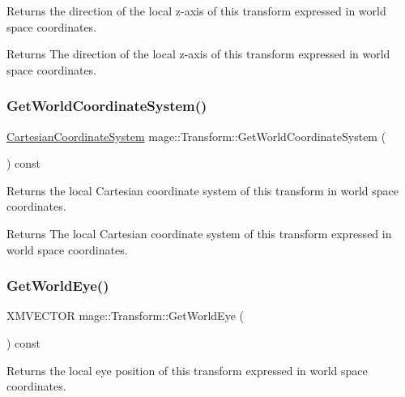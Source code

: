 Returns the direction of the local z-\/axis of this transform expressed in world space coordinates.

\begin{DoxyReturn}{Returns}
The direction of the local z-\/axis of this transform expressed in world space coordinates. 
\end{DoxyReturn}
\hypertarget{structmage_1_1_transform_a809600adbb284334d444ae8c50b17a1d}{}\label{structmage_1_1_transform_a809600adbb284334d444ae8c50b17a1d} 
\subsubsection{\texorpdfstring{Get\+World\+Coordinate\+System()}{GetWorldCoordinateSystem()}}
{\footnotesize\ttfamily \hyperlink{structmage_1_1_cartesian_coordinate_system}{Cartesian\+Coordinate\+System} mage\+::\+Transform\+::\+Get\+World\+Coordinate\+System (\begin{DoxyParamCaption}{ }\end{DoxyParamCaption}) const}

Returns the local Cartesian coordinate system of this transform in world space coordinates.

\begin{DoxyReturn}{Returns}
The local Cartesian coordinate system of this transform expressed in world space coordinates. 
\end{DoxyReturn}
\hypertarget{structmage_1_1_transform_a41ba0976f707bc9bcfa646e53d7e9507}{}\label{structmage_1_1_transform_a41ba0976f707bc9bcfa646e53d7e9507} 
\subsubsection{\texorpdfstring{Get\+World\+Eye()}{GetWorldEye()}}
{\footnotesize\ttfamily X\+M\+V\+E\+C\+T\+OR mage\+::\+Transform\+::\+Get\+World\+Eye (\begin{DoxyParamCaption}{ }\end{DoxyParamCaption}) const}

Returns the local eye position of this transform expressed in world space coordinates.

